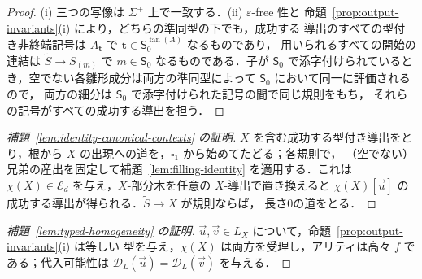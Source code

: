 \documentclass[11pt,a4paper]{ltjsarticle}
\numberwithin{equation}{section}
\theoremstyle{plain}
\theoremstyle{definition}
\theoremstyle{remark}
\newcommand{\D}{\mathcal{D}}
\newcommand{\tuple}[1]{\vec{#1}}
\newcommand{\blank}{\square}
\newcommand{\eps}{\varepsilon}
\newcommand{\fan}{\operatorname{fan}}
\theoremstyle{plain}
\begin{document}
\begin{proof}
(i) 三つの写像は $\Sigma^+$ 上で一致する．(ii) $\eps$-free 性と
命題~\ref{prop:output-invariants}(i) により，どちらの準同型の下でも，成功する
導出のすべての型付き非終端記号は $A_{\mathbf t}$ で $\mathbf t\in \mathsf S_0^{\fan(A)}$ なるものであり，
用いられるすべての開始の連結は $\widetilde S\to S_{(m)}$ で $m\in \mathsf S_0$ なるものである．子が
$\mathsf S_0$ で添字付けられているとき，空でない各雛形成分は両方の準同型によって $\mathsf S_0$ において同一に評価されるので，
両方の細分は $\mathsf S_0$ で添字付けられた記号の間で同じ規則をもち，
それらの記号がすべての成功する導出を担う．
\end{proof}

\begin{proof}[補題~\ref{lem:identity-canonical-contexts} の証明]
$X$ を含む成功する型付き導出をとり，根から
$X$ の出現への道を，$\blank_1$ から始めてたどる；各規則で，
（空でない）兄弟の産出を固定して補題~\ref{lem:filling-identity} を適用する．これは
$\chi(X)\in\mathcal E_d$ を与え，$X$-部分木を任意の $X$-導出で置き換えると
$\chi(X)[\tuple u]$ の成功する導出が得られる．$\widetilde S\to X$ が規則ならば，
長さ0の道をとる．
\end{proof}

\begin{proof}[補題~\ref{lem:typed-homogeneity} の証明]
$\tuple u,\tuple v\in L_X$ について，命題~\ref{prop:output-invariants}(i) は等しい
型を与え，$\chi(X)$ は両方を受理し，アリティは高々 $f$ である；代入可能性は
$\D_L(\tuple u)=\D_L(\tuple v)$ を与える．
\end{proof}
\end{document}

